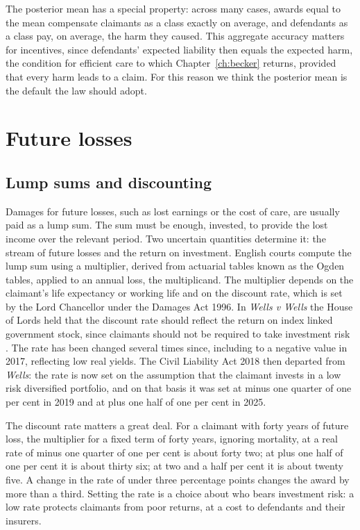 The posterior mean has a special property: across many cases, awards equal to the mean compensate claimants as a class exactly on average, and defendants as a class pay, on average, the harm they caused. This aggregate accuracy matters for incentives, since defendants' expected liability then equals the expected harm, the condition for efficient care to which Chapter~\ref{ch:becker} returns, provided that every harm leads to a claim. For this reason we think the posterior mean is the default the law should adopt.

\section{Future losses}

\subsection{Lump sums and discounting}

Damages for future losses, such as lost earnings or the cost of care, are usually paid as a lump sum. The sum must be enough, invested, to provide the lost income over the relevant period. Two uncertain quantities determine it: the stream of future losses and the return on investment. English courts compute the lump sum using a multiplier, derived from actuarial tables known as the Ogden tables, applied to an annual loss, the multiplicand. The multiplier depends on the claimant's life expectancy or working life and on the discount rate, which is set by the Lord Chancellor under the Damages Act 1996. In \emph{Wells v Wells} the House of Lords held that the discount rate should reflect the return on index linked government stock, since claimants should not be required to take investment risk \citep{wells1999}. The rate has been changed several times since, including to a negative value in 2017, reflecting low real yields. The Civil Liability Act 2018 then departed from \emph{Wells}: the rate is now set on the assumption that the claimant invests in a low risk diversified portfolio, and on that basis it was set at minus one quarter of one per cent in 2019 and at plus one half of one per cent in 2025.

The discount rate matters a great deal. For a claimant with forty years of future loss, the multiplier for a fixed term of forty years, ignoring mortality, at a real rate of minus one quarter of one per cent is about forty two; at plus one half of one per cent it is about thirty six; at two and a half per cent it is about twenty five. A change in the rate of under three percentage points changes the award by more than a third. Setting the rate is a choice about who bears investment risk: a low rate protects claimants from poor returns, at a cost to defendants and their insurers.

